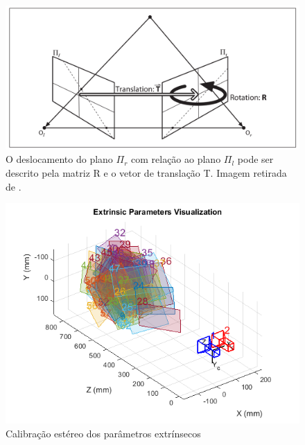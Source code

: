 \begin{figure}[H]
 	\centering
 	\includegraphics[scale=0.25]{./Resources/bradski/essential_geometry.png}
 	\caption{O deslocamento do plano $\Pi_r$ com relação ao plano $\Pi_l$ pode ser descrito pela matriz R e o vetor de translação T. Imagem retirada de \cite{Bradski2008}.}
 	\label{essential_geometry.png}
\end{figure}


\begin{figure}[H]
 	\centering
 	\includegraphics[scale=0.70]{./Resources/stereo_calib_extrinsic.png}
 	\caption{Calibração estéreo dos parâmetros extrínsecos}
 	\label{stereo_calib_extrinsic}
\end{figure}







